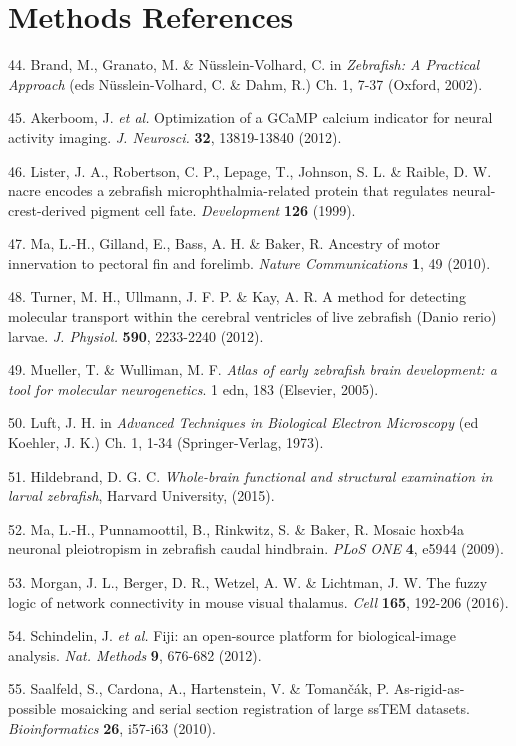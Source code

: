 \documentclass{article}
\begin{document}
\section*{Methods References}
\begin{hangpars}

44. Brand, M., Granato, M. \& Nüsslein-Volhard, C. in \textit{Zebrafish: A Practical Approach} (eds Nüsslein-Volhard, C. \& Dahm, R.) Ch. 1, 7-37 (Oxford, 2002).

45. Akerboom, J.\textit{ et al.} Optimization of a GCaMP calcium indicator for neural activity imaging. \textit{J. Neurosci.} \textbf{32}, 13819-13840 (2012).

46. Lister, J. A., Robertson, C. P., Lepage, T., Johnson, S. L. \& Raible, D. W. nacre encodes a zebrafish microphthalmia-related protein that regulates neural-crest-derived pigment cell fate. \textit{Development} \textbf{126} (1999).

47. Ma, L.-H., Gilland, E., Bass, A. H. \& Baker, R. Ancestry of motor innervation to pectoral fin and forelimb. \textit{Nature Communications} \textbf{1}, 49 (2010).

48. Turner, M. H., Ullmann, J. F. P. \& Kay, A. R. A method for detecting molecular transport within the cerebral ventricles of live zebrafish (Danio rerio) larvae. \textit{J. Physiol.} \textbf{590}, 2233-2240 (2012).

49. Mueller, T. \& Wulliman, M. F. \textit{Atlas of early zebrafish brain development: a tool for molecular neurogenetics}. 1 edn, 183 (Elsevier, 2005).

50. Luft, J. H. in \textit{Advanced Techniques in Biological Electron Microscopy} (ed Koehler, J. K.) Ch. 1, 1-34 (Springer-Verlag, 1973).

51. Hildebrand, D. G. C. \textit{Whole-brain functional and structural examination in larval zebrafish}, Harvard University, (2015).

52. Ma, L.-H., Punnamoottil, B., Rinkwitz, S. \& Baker, R. Mosaic hoxb4a neuronal pleiotropism in zebrafish caudal hindbrain. \textit{PLoS ONE} \textbf{4}, e5944 (2009).

53. Morgan, J. L., Berger, D. R., Wetzel, A. W. \& Lichtman, J. W. The fuzzy logic of network connectivity in mouse visual thalamus. \textit{Cell} \textbf{165}, 192-206 (2016).

54. Schindelin, J.\textit{ et al.} Fiji: an open-source platform for biological-image analysis. \textit{Nat. Methods} \textbf{9}, 676-682 (2012).

55. Saalfeld, S., Cardona, A., Hartenstein, V. \& Tomančák, P. As-rigid-as-possible mosaicking and serial section registration of large ssTEM datasets. \textit{Bioinformatics} \textbf{26}, i57-i63 (2010).


\end{hangpars}
\end{document}
